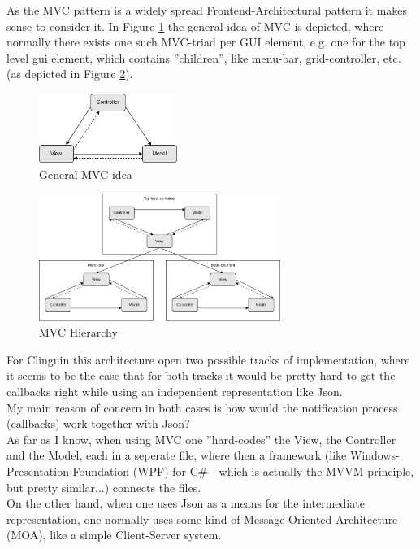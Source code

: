 \documentclass[12pt,a4paper]{article}
\newcommand{\<}[1]{\guilsinglleft}
\renewcommand{\>}[1]{\guilsinglright}
\begin{document}
\noindent As the MVC pattern is a widely spread Frontend-Architectural pattern it makes sense to consider it. In Figure \ref{fig:mvc} the general idea of MVC is depicted, where normally there exists one such MVC-triad per GUI element, e.g. one for the top level gui element, which contains ''children'', like menu-bar, grid-controller, etc. (as depicted in Figure \ref{fig:mvc-hierarchy}).\\


\begin{figure}[ht]
    \begin{center}
    \includegraphics[width=0.4\textwidth]{imgs/mvc.png}
    \caption{General MVC idea}
    \label{fig:mvc}
    \end{center}
\end{figure}

\begin{figure}[ht]
    \begin{center}
    \includegraphics[width=0.7\textwidth]{imgs/mvc-architecture.png}
    \caption{MVC Hierarchy}
    \label{fig:mvc-hierarchy}
    \end{center}
\end{figure}

\noindent For Clinguin this architecture open two possible tracks of implementation, where it seems to be the case that for both tracks it would be pretty hard to get the callbacks right while using an independent representation like Json.\\[1em]
My main reason of concern in both cases is how would the notification process (callbacks) work together with Json?\\
As far as I know, when using MVC one ''hard-codes'' the View, the Controller and the Model, each in a seperate file, where then a framework (like Windows-Presentation-Foundation (WPF) for C\# - which is actually the MVVM principle, but pretty similar...) connects the files.\\
On the other hand, when one uses Json as a means for the intermediate representation, one normally uses some kind of Message-Oriented-Architecture (MOA), like a simple Client-Server system.\\
\end{document}

